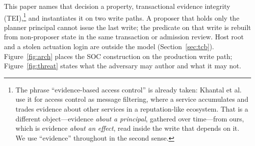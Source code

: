 \documentclass[acmsmall,manuscript,review,anonymous]{acmart}
\renewcommand{\_}{\discretionary{\textunderscore}{}{\textunderscore}}
\begin{document}
This paper names that decision a property, transactional evidence integrity
(TEI),\footnote{The phrase ``evidence-based access control'' is already taken:
Khantal et al.~\cite{khantal2008evidence} use it for access control as message
filtering, where a service accumulates and trades evidence about other services
in a reputation-like ecosystem. That is a different object---evidence
\emph{about a principal}, gathered over time---from ours, which is evidence
\emph{about an effect}, read inside the write that depends on it. We use
``evidence'' throughout in the second sense.} and instantiates it on two
write paths. A proposer that holds only the planner principal cannot issue
the last write; the predicate on that write is rebuilt from non-proposer
state in the same transaction or admission review. Host root and a stolen
actuation login are outside the model
(Section~\ref{sec:tcb}). Figure~\ref{fig:arch} places the SOC construction
on the production write path; Figure~\ref{fig:threat} states what the
adversary may author and what it may not.
\end{document}
